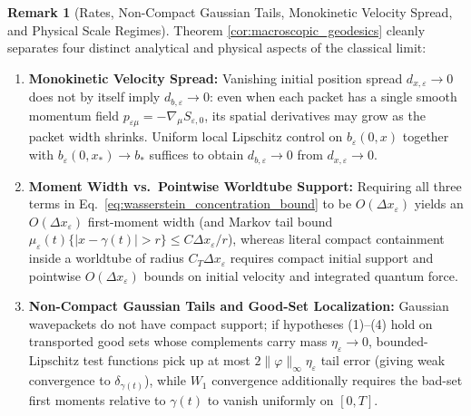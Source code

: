\documentclass[11pt, a4paper]{article}
\theoremstyle{definition}
\newtheorem{remark}[theorem]{Remark}
\begin{document}
\begin{remark}[Rates, Non-Compact Gaussian Tails, Monokinetic Velocity Spread, and Physical Scale Regimes]
\label{rem:wkb_rates_tails}
Theorem \ref{cor:macroscopic_geodesics} cleanly separates four distinct analytical and physical aspects of the classical limit:
\begin{enumerate}[label=(\arabic*)]
    \item \textbf{Monokinetic Velocity Spread:} Vanishing initial position spread $d_{x,\varepsilon} \to 0$ does not by itself imply $d_{b,\varepsilon} \to 0$: even when each packet has a single smooth momentum field $p_{\varepsilon\mu} = -\nabla_\mu S_{\varepsilon,0}$, its spatial derivatives may grow as the packet width shrinks. Uniform local Lipschitz control on $b_\varepsilon(0, x)$ together with $b_\varepsilon(0, x_*) \to b_*$ suffices to obtain $d_{b,\varepsilon} \to 0$ from $d_{x,\varepsilon} \to 0$.
    \item \textbf{Moment Width vs.\ Pointwise Worldtube Support:} Requiring all three terms in Eq.~\eqref{eq:wasserstein_concentration_bound} to be $O(\Delta x_\varepsilon)$ yields an $O(\Delta x_\varepsilon)$ first-moment width (and Markov tail bound $\mu_\varepsilon(t)\{|x - \gamma(t)| > r\} \le C\Delta x_\varepsilon / r$), whereas literal compact containment inside a worldtube of radius $C_T \Delta x_\varepsilon$ requires compact initial support and pointwise $O(\Delta x_\varepsilon)$ bounds on initial velocity and integrated quantum force.
    \item \textbf{Non-Compact Gaussian Tails and Good-Set Localization:} Gaussian wavepackets do not have compact support; if hypotheses (1)--(4) hold on transported good sets whose complements carry mass $\eta_\varepsilon \to 0$, bounded-Lipschitz test functions pick up at most $2\|\varphi\|_\infty \eta_\varepsilon$ tail error (giving weak convergence to $\delta_{\gamma(t)}$), while $W_1$ convergence additionally requires the bad-set first moments relative to $\gamma(t)$ to vanish uniformly on $[0, T]$.

\end{enumerate}
\end{remark}
\end{document}
